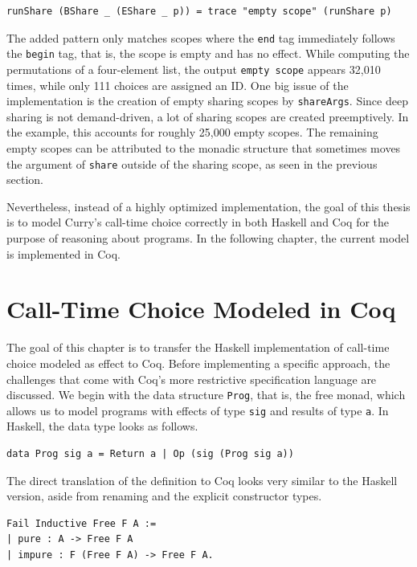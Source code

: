\documentclass[a4paper, 11pt, fleqn, twoside]{scrreprt}
\newcommand{\hinl}[1]{\texttt{#1}}
\begin{document}
\begin{verbatim}
runShare (BShare _ (EShare _ p)) = trace "empty scope" (runShare p)
\end{verbatim}

The added pattern only matches scopes where the \hinl{end} tag immediately follows the \hinl{begin} tag, that is, the scope is empty and has no effect.
While computing the permutations of a four-element list, the output \hinl{empty scope} appears 32,010 times, while only 111 choices are assigned an ID.
One big issue of the implementation is the creation of empty sharing scopes by \hinl{shareArgs}.
Since deep sharing is not demand-driven, a lot of sharing scopes are created preemptively.
In the example, this accounts for roughly 25,000 empty scopes.
The remaining empty scopes can be attributed to the monadic structure that sometimes moves the argument of \hinl{share} outside of the sharing scope, as seen in the previous section.

Nevertheless, instead of a highly optimized implementation, the goal of this thesis is to model Curry's call-time choice correctly in both Haskell and Coq for the purpose of reasoning about programs.
In the following chapter, the current model is implemented in Coq.



\chapter{Call-Time Choice Modeled in Coq}
\label{ch:callTimeChoiceCoq}

The goal of this chapter is to transfer the Haskell implementation of call-time choice modeled as effect to Coq.
Before implementing a specific approach, the challenges that come with Coq's more restrictive specification language are discussed.
We begin with the data structure \hinl{Prog}, that is, the free monad, which allows us to model programs with effects of type \hinl{sig} and results of type \hinl{a}.
In Haskell, the data type looks as follows.

\begin{verbatim}
data Prog sig a = Return a | Op (sig (Prog sig a))
\end{verbatim}

The direct translation of the definition to Coq looks very similar to the Haskell version, aside from renaming and the explicit constructor types.

\begin{verbatim}
Fail Inductive Free F A :=
| pure : A -> Free F A
| impure : F (Free F A) -> Free F A.
\end{verbatim}
\end{document}
